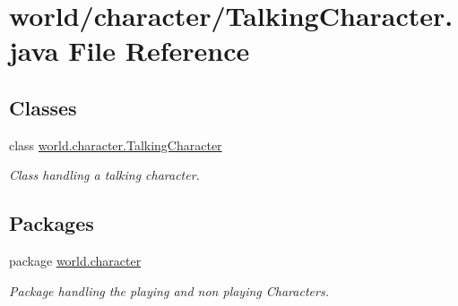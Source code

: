 \hypertarget{a00060}{\section{world/character/\-Talking\-Character.java File Reference}
\label{a00060}
}
\subsection*{Classes}
\begin{DoxyCompactItemize}
\item 
class \hyperlink{a00029}{world.\-character.\-Talking\-Character}
\begin{DoxyCompactList}\small\item\em Class handling a talking character. \end{DoxyCompactList}\end{DoxyCompactItemize}
\subsection*{Packages}
\begin{DoxyCompactItemize}
\item 
package \hyperlink{a00090}{world.\-character}
\begin{DoxyCompactList}\small\item\em Package handling the playing and non playing Characters. \end{DoxyCompactList}\end{DoxyCompactItemize}
